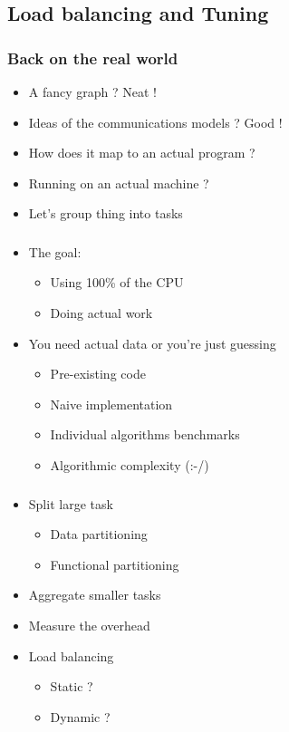 \subsection{Load balancing and Tuning}
\label{subsec:label}

\begin{frame}
  \frametitle{Back on the real world}

  \begin{itemize}
  \item A fancy graph ? Neat !
  \item Ideas of the communications models ? Good !
  \item How does it map to an actual program ?
  \item Running on an actual machine ?
  \item Let's group thing into tasks
  \end{itemize}
\end{frame}

\begin{frame}
  \frametitle{}

  \begin{itemize}
  \item The goal:
    \begin{itemize}
    \item Using 100\% of the CPU
    \item Doing actual work
    \end{itemize}
  \item You need actual data or you're just guessing
    \begin{itemize}
    \item Pre-existing code
    \item Naive implementation
    \item Individual algorithms benchmarks
    \item Algorithmic complexity (:-/)
    \end{itemize}
  \end{itemize}
\end{frame}


\begin{frame}
  \frametitle{}

  \begin{itemize}
  \item Split large task
    \begin{itemize}
    \item Data partitioning
    \item Functional partitioning
    \end{itemize}
  \item Aggregate smaller tasks
  \item Measure the overhead
  \item Load balancing
    \begin{itemize}
    \item Static ?
    \item Dynamic ?
    \end{itemize}
  \end{itemize}
\end{frame}


